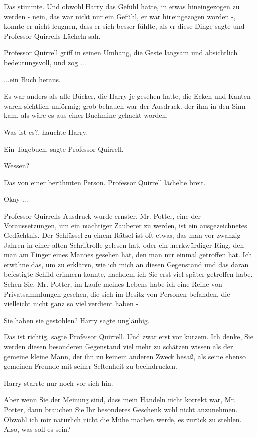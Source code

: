 Das stimmte. Und obwohl Harry das Gefühl hatte, in etwas hineingezogen zu werden
- nein, das war nicht nur ein Gefühl, er war hineingezogen worden -, konnte er
nicht leugnen, dass er sich besser fühlte, als er diese Dinge sagte und
Professor Quirrells Lächeln sah.

Professor Quirrell griff in seinen Umhang, die Geste langsam und absichtlich
bedeutungsvoll, und zog ...

...ein Buch heraus.

Es war anders als alle Bücher, die Harry je gesehen hatte, die Ecken und Kanten
waren sichtlich unförmig; grob behauen war der Ausdruck, der ihm in den Sinn
kam, als wäre es aus einer Buchmine gehackt worden.

\glqq{}Was ist es?\grqq{}, hauchte Harry.

\glqq{}Ein Tagebuch\grqq{}, sagte Professor Quirrell.

\glqq{}Wessen?\grqq{}

\glqq{}Das von einer berühmten Person.\grqq{} Professor Quirrell lächelte breit.

\glqq{}Okay ...\grqq{}

Professor Quirrells Ausdruck wurde ernster. \glqq{}Mr. Potter, eine der
Voraussetzungen, um ein mächtiger Zauberer zu werden, ist ein ausgezeichnetes
Gedächtnis. Der Schlüssel zu einem Rätsel ist oft etwas, das man vor zwanzig
Jahren in einer alten Schriftrolle gelesen hat, oder ein merkwürdiger Ring, den
man am Finger eines Mannes gesehen hat, den man nur einmal getroffen hat. Ich
erwähne das, um zu erklären, wie ich mich an diesen Gegenstand und das daran
befestigte Schild erinnern konnte, nachdem ich Sie erst viel später getroffen
habe. Sehen Sie, Mr. Potter, im Laufe meines Lebens habe ich eine Reihe von
Privatsammlungen gesehen, die sich im Besitz von Personen befanden, die
vielleicht nicht ganz so viel verdient haben -\grqq{}

\glqq{}Sie haben sie gestohlen?\grqq{} Harry sagte ungläubig.

\glqq{}Das ist richtig\grqq{}, sagte Professor Quirrell. \glqq{}Und zwar erst
vor kurzem. Ich denke, Sie werden diesen besonderen Gegenstand viel mehr zu
schätzen wissen als der gemeine kleine Mann, der ihn zu keinem anderen Zweck
besaß, als seine ebenso gemeinen Freunde mit seiner Seltenheit zu
beeindrucken.\grqq{}

Harry starrte nur noch vor sich hin.

\glqq{}Aber wenn Sie der Meinung sind, dass mein Handeln nicht korrekt war, Mr.
Potter, dann brauchen Sie Ihr besonderes Geschenk wohl nicht anzunehmen. Obwohl
ich mir natürlich nicht die Mühe machen werde, es zurück zu stehlen. Also, was
soll es sein?\grqq{}

